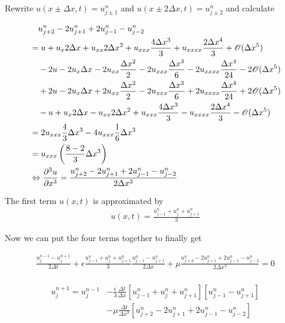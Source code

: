 \documentclass[
	a4paper, %
	10pt, %
]{CSUniSchoolLabReport}
\begin{document}
Rewrite $u(x\pm\Delta x, t) = u_{j\pm1}^n$ and $u(x\pm2\Delta x, t) = u_{j\pm2}^n$ and calculate

\begin{align*}
	&\quad u_{j+2}^n - 2u_{j+1}^n + 2u_{j-1}^n - u_{j-2}^n \\ 
	&=  u + u_{x} 2\Delta x + u_{xx} 2 \Delta x^2+ u_{xxx} \frac{4\Delta x^3}{3} + u_{xxxx}\frac{2\Delta x^4}{3} + \mathscr{O}(\Delta x^5) \\
	&\quad- 2u - 2u_{x} \Delta x - 2u_{xx} \frac{\Delta x^2}{2}- 2u_{xxx} \frac{\Delta x^3}{6} - 2u_{xxxx}\frac{\Delta x^4}{24} - 2\mathscr{O}(\Delta x^5) \\
	&\quad + 2u - 2u_{x} \Delta x + 2u_{xx} \frac{\Delta x^2}{2} - 2u_{xxx} \frac{\Delta x^3}{6} + 2u_{xxxx}\frac{\Delta x^4}{24} + 2\mathscr{O}(\Delta x^5) \\
	&\quad -u + u_{x} 2\Delta x - u_{xx} 2 \Delta x^2+ u_{xxx} \frac{4\Delta x^3}{3} - u_{xxxx}\frac{2\Delta x^4}{3} - \mathscr{O}(\Delta x^5)\\
	&= 2 u_{xxx} \frac{4}{3} \Delta x^3 - 4 u_{xxx} \frac{1}{6} \Delta x^3 \\
	&= u_{xxx} \left( \frac{8-2}{3} \Delta x^3  \right) \\
	&\Leftrightarrow \pdv{^3u}{x^3} = \frac{u_{j+2}^n - 2u_{j+1}^n + 2u_{j-1}^n - u_{j-2}^n}{2 \Delta x^3}
\end{align*}


The first term $u(x,t)$ is approximated by 
\begin{align*}
	u(x,t) = \frac{u_{j-1}^n + u_j^n + u_{j+1}^n}{3}
\end{align*}

Now we can put the four terms together to finally get

\begin{align*}
	\frac{u_{j}^{n-1}-u_{j}^{n+1}}{2\Delta t} + \epsilon \frac{u_{j-1}^n + u_j^n + u_{j+1}^n}{3} \frac{u_{j-1}^n-u_{j+1}^n}{2\Delta x} + \mu \frac{u_{j+2}^n - 2u_{j+1}^n + 2u_{j-1}^n - u_{j-2}^n}{2 \Delta x^3} = 0 \\
\end{align*}

\begin{align}
	u_j^{n+1} = u_j^{n-1} &- \frac{\epsilon}{3} \frac{\Delta t}{\Delta x} [u_{j-1}^n + u_j^n + u_{j+1}^n] [u_{j-1}^n-u_{j+1}^n] 
	\\ &- \mu \frac{\Delta t}{\Delta x^3} [u_{j+2}^n - 2u_{j+1}^n + 2u_{j-1}^n - u_{j-2}^n]\nonumber
\end{align}
\end{document}
